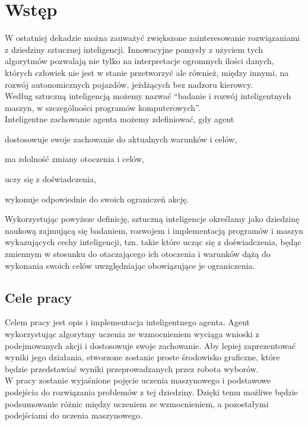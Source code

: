 \chapter{Wstęp}
\label{cha:wstep}

W ostatniej dekadzie można zauważyć zwiększone zainteresowanie rozwiązaniami z dziedziny
sztucznej inteligencji. Innowacyjne pomysły z użyciem tych algorytmów pozwalają nie tylko na interpretacje ogromnych 
ilości danych, których człowiek nie jest w stanie przetworzyć ale również, między innymi, na rozwój 
autonomicznych pojazdów, jeżdżących bez nadzoru kierowcy.\\
Według \cite{mccarthy2007artificial} sztuczną inteligencją możemy nazwać ``badanie i rozwój inteligentnych maszyn, 
w szczególności programów komputerowych''.\\
Inteligentne zachowanie agenta możemy zdefiniować, gdy agent\cite{L.:2010:AIF:1809744}
\begin{itemize*}
 \item dostosowuje swoje zachowanie do aktualnych warunków i celów,
 \item ma zdolność zmiany otoczenia i celów,
 \item uczy się z doświadczenia,
 \item wykonuje odpowiednie do swoich ograniczeń akcję.
\end{itemize*}
Wykorzystując powyższe definicję, sztuczną inteligencje określamy jako dziedzinę naukową zajmującą się badaniem, 
rozwojem i implementacją programów i maszyn wykazujących cechy inteligencji, tzn. takie które ucząc się z 
doświadczenia, będąc zmiennym w stosunku do otaczającego ich otoczenia i warunków dążą do wykonania swoich celów 
uwzględniając obowiązujące je ograniczenia. 

\section{Cele pracy}
\label{sec:celePracy}

Celem pracy jest opis i implementacja inteligentnego agenta. Agent wykorzystując algorytmy uczenia ze wzmocnieniem 
wyciąga wnioski z podejmowanych akcji i dostosowuje swoje zachowanie. Aby lepiej zaprezentować wyniki jego działania,
stworzone zostanie proste środowisko graficzne, które będzie przedstawiać wyniki przeprowadzanych przez robota wyborów.
\\
W pracy zostanie wyjaśnione pojęcie uczenia maszynowego i podstawowe podejścia do rozwiązania problemów z tej dziedziny.
Dzięki temu możliwe będzie podsumowanie różnic między uczeniem ze wzmocnieniem, a pozostałymi podejściami do uczenia 
maszynowego.


